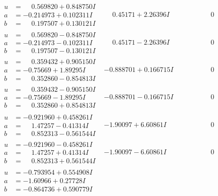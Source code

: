 \documentclass[1p]{elsarticle_modified}
\theoremstyle{definition}
\begin{document}
$$\begin{array}{c|c|c}
\begin{aligned}
u &= \phantom{-}0.569820 + 0.848750 I \\
a &= -0.214973 + 0.102311 I \\
b &= \phantom{-}0.197507 + 0.130121 I\end{aligned}
 & \phantom{-}0.45171 + 2.26396 I & \phantom{-0.000000 } 0 \\ \hline\begin{aligned}
u &= \phantom{-}0.569820 - 0.848750 I \\
a &= -0.214973 - 0.102311 I \\
b &= \phantom{-}0.197507 - 0.130121 I\end{aligned}
 & \phantom{-}0.45171 - 2.26396 I & \phantom{-0.000000 } 0 \\ \hline\begin{aligned}
u &= \phantom{-}0.359432 + 0.905150 I \\
a &= -0.75669 + 1.89295 I \\
b &= \phantom{-}0.352860 - 0.854813 I\end{aligned}
 & -0.888701 + 0.166715 I & \phantom{-0.000000 } 0 \\ \hline\begin{aligned}
u &= \phantom{-}0.359432 - 0.905150 I \\
a &= -0.75669 - 1.89295 I \\
b &= \phantom{-}0.352860 + 0.854813 I\end{aligned}
 & -0.888701 - 0.166715 I & \phantom{-0.000000 } 0 \\ \hline\begin{aligned}
u &= -0.921960 + 0.458261 I \\
a &= \phantom{-}1.47257 - 0.41314 I \\
b &= \phantom{-}0.852313 - 0.561544 I\end{aligned}
 & -1.90097 + 6.60861 I & \phantom{-0.000000 } 0 \\ \hline\begin{aligned}
u &= -0.921960 - 0.458261 I \\
a &= \phantom{-}1.47257 + 0.41314 I \\
b &= \phantom{-}0.852313 + 0.561544 I\end{aligned}
 & -1.90097 - 6.60861 I & \phantom{-0.000000 } 0 \\ \hline\begin{aligned}
u &= -0.793954 + 0.554908 I \\
a &= -1.60966 + 0.27728 I \\
b &= -0.864736 + 0.590779 I\end{aligned}

\end{array}$$
\end{document}
